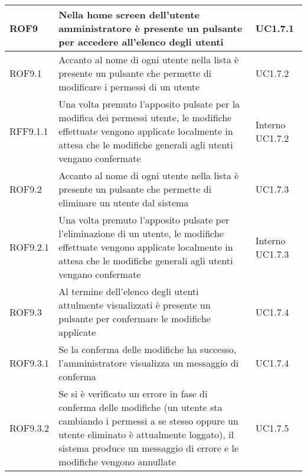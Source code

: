 \begin{center}
\begin{longtable}{| p{2.5cm} | p{8cm} | p{2cm} |}
		ROF9  &  Nella home screen dell'utente amministratore è presente un pulsante per accedere all'elenco degli utenti  &  UC1.7.1 \\
		\hline
		ROF9.1  &  Accanto al nome di ogni utente nella lista è presente un pulsante che permette di modificare i permessi di un utente  &  UC1.7.2 \\
		\hline
		RFF9.1.1  &  Una volta premuto l'apposito pulsate per la modifica dei permessi utente, le modifiche effettuate vengono applicate localmente in attesa che le modifiche generali agli utenti vengano confermate  &  Interno \newline UC1.7.2 \\
		\hline
		ROF9.2  &  Accanto al nome di ogni utente nella lista è presente un pulsante che permette di eliminare un utente dal sistema  &  UC1.7.3 \\
		\hline
		ROF9.2.1  &  Una volta premuto l'apposito pulsate per l'eliminazione di un utente, le modifiche effettuate vengono applicate localmente in attesa che le modifiche generali agli utenti vengano confermate  &  Interno \newline UC1.7.3 \\
		\hline
		ROF9.3  &  Al termine dell'elenco degli utenti attulmente visualizzati è presente un pulsante per confermare le modifiche applicate  &  UC1.7.4 \\
		\hline
		ROF9.3.1  &  Se la conferma delle modifiche ha successo, l'amministratore visualizza un messaggio di conferma  &  UC1.7.4 \\
		\hline
		ROF9.3.2  &  Se si è verificato un errore in fase di conferma delle modifiche (un utente sta cambiando i permessi a se stesso oppure un utente eliminato è attualmente loggato), il sistema produce un messaggio di errore e le modifiche vengono annullate &  UC1.7.5 \\
		\hline




\end{longtable}
\end{center}
